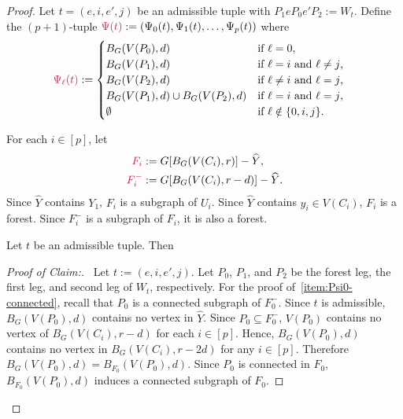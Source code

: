\documentclass{patmorin}
\newenvironment{clmproof}{\begin{proof}[Proof of Claim:]\renewcommand{\qedsymbol}{\rule{1ex}{1ex}}}{\end{proof}}
\DeclarePairedDelimiter\set{\{}{\}}
\begin{document}
\begin{proof}
Let $t=(e,i,e',j)$ be an admissible tuple with $P_1eP_0e'P_2:=W_t$. Define the $(p+1)$-tuple $\mathdefin{\Psi(t)}:=(\Psi_0(t),\Psi_1(t),\ldots,\Psi_p(t))$ where
\begin{align*}
    \mathdefin{\Psi_\ell(t)} &:=
    \begin{cases}
        B_{G}(V(P_0),d)&\textrm{if $\ell=0$,}\\
        B_{G}(V(P_1),d)&\textrm{if $\ell=i$ and $\ell\neq j$,}\\
        B_{G}(V(P_2),d)&\textrm{if $\ell\neq i$ and $\ell= j$,}\\
        B_{G}(V(P_1),d)\cup B_{G}(V(P_2),d)&\textrm{if $\ell= i$ and $\ell= j$,}\\
        \emptyset&\textrm{if $\ell\notin\{0,i,j\}$.}
    \end{cases}
\end{align*}

For each $i\in[p]$, let
\begin{align*}
\mathdefin{F_i}&:=G[B_G(V(C_i),r)]-\widehat{Y},\\
\mathdefin{F_i^-}&:=G[B_G(V(C_i),r-d)]-\widehat{Y}.
\end{align*}
Since $\widehat{Y}$ contains $Y_1$,
$F_i$ is a subgraph of $U_i$.  Since $\widehat{Y}$ contains $y_i\in V(C_i)$, $F_i$ is a forest.  Since $F^-_i$ is a subgraph of $F_i$, it is also a forest.

\begin{clm}\label{clm:three-components}
Let $t$ be an admissible tuple. Then
\end{clm}

\begin{clmproof}\
    Let $t:=(e,i,e',j)$.
    Let $P_0$, $P_1$, and $P_2$ be the forest leg, the first leg, and second leg of $W_t$, respectively.   For the proof of~\cref{item:Psi0-connected}, recall that $P_0$ is a connected subgraph of $F_0^-$. Since $t$ is admissible, $B_G(V(P_0),d)$ contains no vertex in $\widehat{Y}$. Since $P_0\subseteq F_0^-$, $V(P_0)$ contains no vertex of $B_G(V(C_i),r-d)$ for each $i\in[p]$. Hence, $B_G(V(P_0),d)$ contains no vertex in $B_G(V(C_i),r-2d)$ for any $i\in[p]$. Therefore $B_G(V(P_0),d)=B_{F_0}(V(P_0),d)$.
    Since $P_0$ is connected in $F_0$,
    $B_{F_0}(V(P_0),d)$ induces a connected subgraph of $F_0$.


\end{clmproof}
\end{proof}
\end{document}

